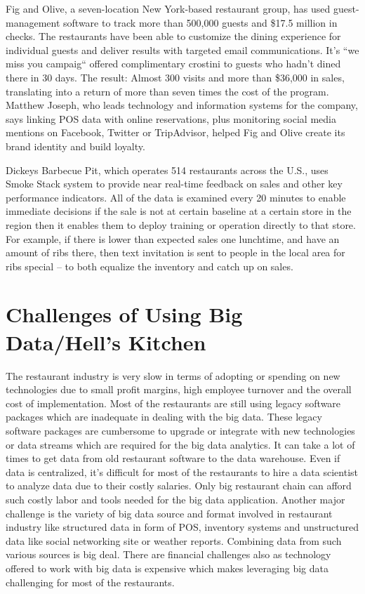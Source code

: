 \documentclass[sigconf]{acmart}
\begin{document}
Fig and Olive, a seven-location New York-based restaurant group, has used guest-management software to track more than 500,000 guests and \$17.5 million in checks. The restaurants have been able to customize the dining experience for individual guests and deliver results with targeted email communications. It's ``we miss you campaig`` offered complimentary crostini to guests who hadn't dined there in 30 days. The result: Almost 300 visits and more than \$36,000 in sales, translating into a return of more than seven times the cost of the program. Matthew Joseph, who leads technology and information systems for the company, says linking POS data with online reservations, plus monitoring social media mentions on Facebook, Twitter or TripAdvisor, helped Fig and Olive create its brand identity and build loyalty.\cite{www-restaurant}


 Dickeys Barbecue Pit, which operates 514 restaurants across the U.S., uses Smoke Stack system to provide near real-time feedback on sales and other key performance indicators. All of the data is examined every 20 minutes to enable immediate decisions if the sale is not at certain baseline at a certain store in the region then it enables them to deploy training or operation directly to that store. For example, if there is lower than expected sales one lunchtime, and have an amount of ribs there, then text invitation is sent to people in the local area for ribs special – to both equalize the inventory and catch up on sales.\cite{www-forbes}

\section{Challenges of Using Big Data/Hell's Kitchen}
The restaurant industry is very slow in terms of adopting or spending on new technologies due to small profit margins, high employee turnover and the overall cost of implementation\cite{www-bostonglobe}. Most of the restaurants are still using legacy software packages which are inadequate in dealing with the big data. These legacy software packages are cumbersome to upgrade or integrate with new technologies or data streams which are required for the big data analytics. It can take a lot of times to get data from old restaurant software to the data warehouse. Even if data is centralized, it's difficult for most of the restaurants to hire a data scientist to analyze data due to their costly salaries. Only big restaurant chain can afford such costly labor and tools needed for the big data application\cite{2015BDLC}. Another major challenge is the variety of big data source and format involved in restaurant industry like structured data in form of POS, inventory systems and unstructured data like social networking site or weather reports. Combining data from such various sources is big deal. There are financial challenges also as technology offered to work with big data is expensive which makes leveraging big data challenging for most of the restaurants.\cite{www-foodnewsfeed}
\end{document}
